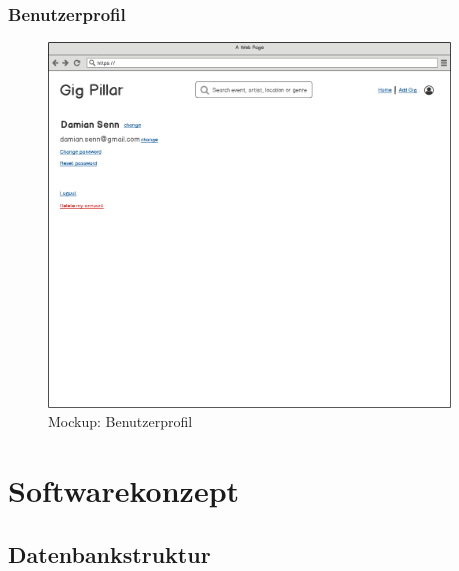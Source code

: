 \clearpage
\subsubsection{Benutzerprofil}

\begin{figure}[!htb]
  \centering
  \includegraphics[width=0.95\textwidth]{mockups/profile.png}
  \caption{Mockup: Benutzerprofil}
\end{figure}

\clearpage
\section{Softwarekonzept}\label{softwarekonzept}

\subsection{Datenbankstruktur}\label{datenbankstruktur}

